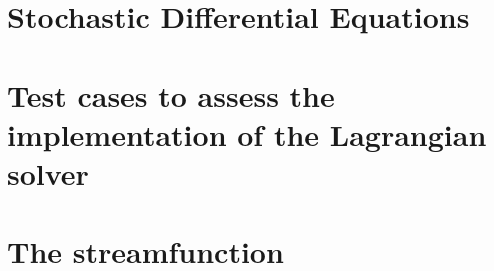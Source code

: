 \chapter{Stochastic Differential Equations}


\chapter{Test cases to assess the implementation of the Lagrangian solver} \label{app:test_case}

\chapter{The streamfunction} \label{app:streamfunction}
